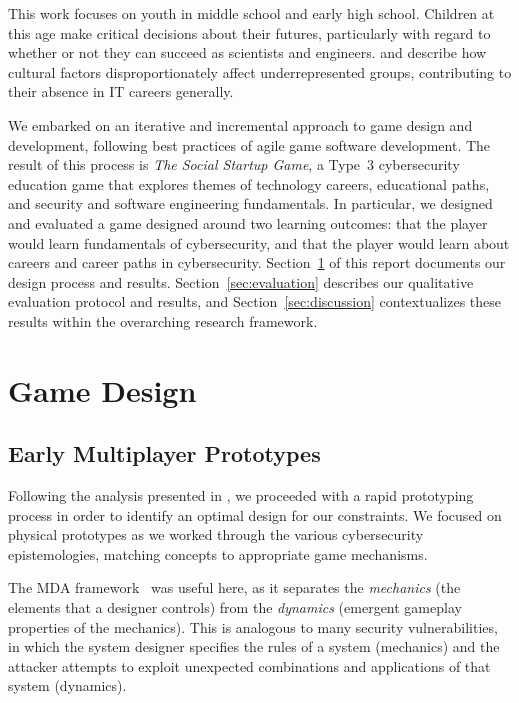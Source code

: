 \documentclass[letterpaper]{article}
\begin{document}
This work focuses on youth in middle school and early high school. Children at
this age make critical decisions about their futures, particularly with regard
to whether or not they can succeed as scientists 
and engineers. \citet{Margolis2003} and \citet{Margolis2010} describe
how cultural factors disproportionately affect underrepresented groups,
contributing to their absence in IT careers generally.

We embarked on an iterative and incremental
approach to game design and development, following best practices
of agile game software development.
The result of this process is \textit{The Social Startup Game}, 
a Type~3 cybersecurity education game that explores themes of
technology careers, educational paths, and security and
software engineering fundamentals.
In particular, we designed and evaluated a game designed around
two learning outcomes: that the player would learn fundamentals of
cybersecurity, and that the player would learn about careers and
career paths in cybersecurity.
Section~\ref{sec:design} of this report documents our design process
and results. Section~\ref{sec:evaluation} describes our
qualitative evaluation protocol and results, and Section~\ref{sec:discussion}
contextualizes these results within the overarching research framework.


\section{Game Design}
\label{sec:design}

\subsection{Early Multiplayer Prototypes}

Following the analysis presented in \citet{Gestwicki2015}, 
we proceeded with a rapid prototyping process in order to identify
an optimal design for our constraints.
We focused on physical prototypes
as we worked through the various cybersecurity epistemologies,
matching concepts to appropriate game mechanisms.

The MDA framework~\citep{Hunicke2004} was useful here, 
as it separates the \textit{mechanics} (the elements that a designer
controls) from the \textit{dynamics} (emergent gameplay properties of the
mechanics). This is analogous to many security vulnerabilities, in which
the system designer specifies the rules of a system (mechanics) and the
attacker attempts to exploit unexpected combinations and applications
of that system (dynamics).
\end{document}
